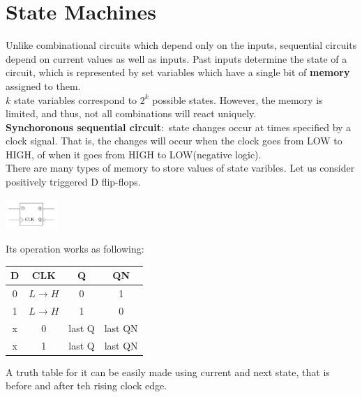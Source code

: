 \documentclass[nobib]{tufte-handout}
\newcommand{\defn}[2]{\noindent\textbf{#1}:\ #2}
\begin{document}
    \section{State Machines}
    Unlike combinational circuits which depend only on the inputs, sequential
    circuits depend on current values as well as inputs. Past inputs determine the
    state of a circuit, which is represented by set variables which have a single
    bit of \textbf{memory} assigned to them.\\ $k$ state variables correspond to
$2^k$ possible states. However, the memory is limited, and thus, not all
    combinations will react uniquely.\\ \defn{Synchoronous sequential
        circuit}{state changes occur at times specified by a clock signal. That is, the
        changes will occur when the clock goes from LOW to HIGH, of when it goes from
        HIGH to LOW(negative logic).}\\ There are many types of memory to store values
    of state varibles. Let us consider positively triggered D flip-flops.\\
    \begin{center}
        \includegraphics[width = 75px]{images/dflipflop.png}
    \end{center}
    Its operation works as following:
    \begin{table}
        \centering
        \begin{tabular}{c c| c c}
            D & CLK              & Q      & QN      \\
            \hline
            0 & $L\rightarrow H$ & 0      & 1       \\
            1 & $L\rightarrow H$ & 1      & 0       \\
            x & 0                & last Q & last QN \\
            x & 1                & last Q & last QN
        \end{tabular}
    \end{table}
    A truth table for it can be easily made using current and next state, that is before and after teh rising clock edge.\\
\end{document}
